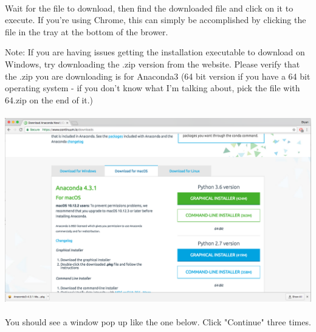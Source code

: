 \documentclass[]{article}
\begin{document}
\clearpage
\paragraph{}
Wait for the file to download, then find the downloaded file and click on it to execute. If you're using Chrome, this can simply be accomplished by clicking the file in the tray at the bottom of the brower.

Note: If you are having issues getting the installation executable to download on Windows, try downloading the .zip version from the website. Please verify that the .zip you are downloading is for Anaconda3 (64 bit version if you have a 64 bit operating system - if you don't know what I'm talking about, pick the file with 64.zip on the end of it.)

\paragraph{}
\begin{centering}
    \centerline{\includegraphics[scale=0.25]{Screenshot_4.png}}
\end{centering}

\paragraph{}
You should see a window pop up like the one below. Click "Continue" three times.
\end{document}
